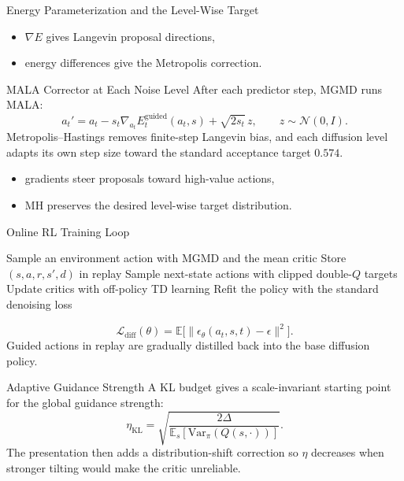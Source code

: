 \documentclass[final,hyperref={pdfpagelabels=false}]{beamer}
\newlength{\colwidth}
\newcommand{\E}{\mathbb{E}}
\newcommand{\Var}{\mathrm{Var}}
\begin{document}
\begin{frame}[t]
\begin{columns}[t]
\begin{column}{\colwidth}
\begin{block}{\Large Energy Parameterization and the Level-Wise Target}
\vspace{0.3em}
\begin{itemize}
  \item $\nabla E$ gives Langevin proposal directions,
  \item energy differences give the Metropolis correction.
\end{itemize}
\end{block}

\vspace{0.8cm}

\begin{block}{\Large MALA Corrector at Each Noise Level}
\small
After each predictor step, MGMD runs MALA:
\[
a_t' = a_t-s_t\nabla_{a_t}E_t^{\mathrm{guided}}(a_t,s)+\sqrt{2s_t}\,z,
\qquad z\sim\mathcal{N}(0,I).
\]
Metropolis--Hastings removes finite-step Langevin bias, and each diffusion level adapts its own step size toward the standard acceptance target $0.574$.

\vspace{0.3em}
\begin{itemize}
  \item gradients steer proposals toward high-value actions,
  \item MH preserves the desired level-wise target distribution.
\end{itemize}
\end{block}

\vspace{0.8cm}

\begin{block}{\Large Online RL Training Loop}
\small
\begin{algorithmic}[1]
\STATE Sample an environment action with MGMD and the mean critic
\STATE Store $(s,a,r,s',d)$ in replay
\STATE Sample next-state actions with clipped double-$Q$ targets
\STATE Update critics with off-policy TD learning
\STATE Refit the policy with the standard denoising loss
\end{algorithmic}
\[
\mathcal{L}_{\mathrm{diff}}(\theta)=\E\bigl[\|\epsilon_\theta(a_t,s,t)-\epsilon\|^2\bigr].
\]
Guided actions in replay are gradually distilled back into the base diffusion policy.
\end{block}

\vspace{0.8cm}

\begin{block}{\Large Adaptive Guidance Strength}
\small
A KL budget gives a scale-invariant starting point for the global guidance strength:
\[
\eta_{\mathrm{KL}}=\sqrt{\frac{2\Delta}{\E_s[\Var_{\pi}(Q(s,\cdot))]}}.
\]
The presentation then adds a distribution-shift correction so $\eta$ decreases when stronger tilting would make the critic unreliable.


\end{block}
\end{column}
\end{columns}
\end{frame}
\end{document}
